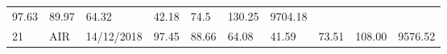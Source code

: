 \documentclass[
  11pt,
]{article}
\begin{document}
\begin{longtable}[]{@{}llllllllll@{}}
\begin{minipage}[t]{0.06\columnwidth}
97.63\strut
\end{minipage} & \begin{minipage}[t]{0.06\columnwidth}\raggedright
89.97\strut
\end{minipage} & \begin{minipage}[t]{0.06\columnwidth}\raggedright
64.32\strut
\end{minipage} & \begin{minipage}[t]{0.06\columnwidth}\raggedright
42.18\strut
\end{minipage} & \begin{minipage}[t]{0.06\columnwidth}\raggedright
74.5\strut
\end{minipage} & \begin{minipage}[t]{0.13\columnwidth}\raggedright
130.25\strut
\end{minipage} & \begin{minipage}[t]{0.08\columnwidth}\raggedright
9704.18\strut
\end{minipage}\tabularnewline
\begin{minipage}[t]{0.04\columnwidth}\raggedright
21\strut
\end{minipage} & \begin{minipage}[t]{0.09\columnwidth}\raggedright
AIR\strut
\end{minipage} & \begin{minipage}[t]{0.10\columnwidth}\raggedright
14/12/2018\strut
\end{minipage} & \begin{minipage}[t]{0.06\columnwidth}\raggedright
97.45\strut
\end{minipage} & \begin{minipage}[t]{0.06\columnwidth}\raggedright
88.66\strut
\end{minipage} & \begin{minipage}[t]{0.06\columnwidth}\raggedright
64.08\strut
\end{minipage} & \begin{minipage}[t]{0.06\columnwidth}\raggedright
41.59\strut
\end{minipage} & \begin{minipage}[t]{0.06\columnwidth}\raggedright
73.51\strut
\end{minipage} & \begin{minipage}[t]{0.13\columnwidth}\raggedright
108.00\strut
\end{minipage} & \begin{minipage}[t]{0.08\columnwidth}\raggedright
9576.52\strut
\end{minipage}\tabularnewline

\end{longtable}
\end{document}
